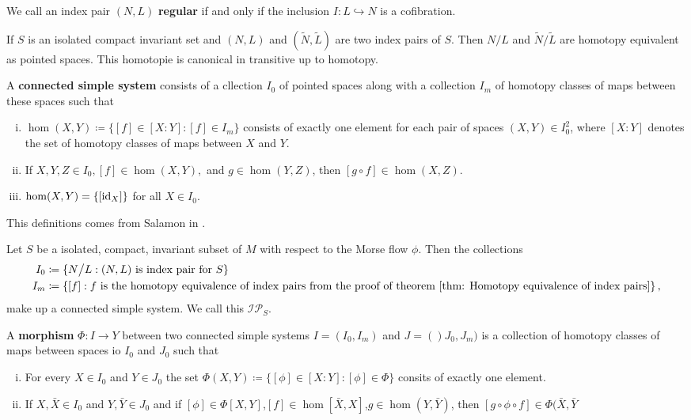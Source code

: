 \begin{definition}
	We call an index pair $(N,L)$ \textbf{regular} if and only if the inclusion $I: L \hookrightarrow N$ is a cofibration.
\end{definition}
\begin{theorem} \label{thm: Homotopy equivalence of index pairs}
	If $S$ is an isolated compact invariant set and $(N,L)$ and $(\tilde{N},\tilde{L})$ are two index pairs of $S$. Then $N/L$ and $\tilde{N}/\tilde{L}$ are homotopy equivalent as pointed spaces. This homotopie is canonical in transitive up to homotopy. 
\end{theorem}
\begin{definition}
	A \textbf{connected simple system} consists of a cllection $I_0$ of pointed spaces along with a collection $I_m$ of homotopy classes of maps between these spaces such that 
		\begin{enumerate}[(i)]
			\item $\hom(X,Y)\coloneq \{[f]\in [X:Y]:[f]\in I_m\}$ consists of exactly one element for each pair of spaces $(X,Y)\in I_0^2$, where $[X:Y]$ denotes the set of homotopy classes of maps between $X$ and $Y$.
			\item If $X,Y,Z\in I_0,[f]\in \hom(X,Y),$ and $g\in \hom(Y,Z)$, then $[g\circ f]\in \hom(X,Z)$.
			\item $\hom(X,Y)=\{[\operatorname{\mathrm{id}}_X]\}$ for all $X\in I_0$. 
		\end{enumerate}
\end{definition}
\begin{remark}
	This definitions comes from Salamon in \cite{Salamon1985}.
\end{remark}
\begin{remark} Let $S$ be a isolated, compact, invariant subset of $M$ with respect to the Morse flow $\phi$. Then the collections
\begin{align*}
	I_0&\coloneq \{N\big/ L: (N,L)\text{ is index pair for }S\}\\
	I_m&\coloneq \{[f]: f \text{ is the homotopy equivalence of index pairs from the proof of theorem \ref{thm: Homotopy equivalence of index pairs}}\}\,,
\end{align*} make up a connected simple system. We call this $\mathcal{IP}_S$.
\end{remark}
\begin{definition}
A \textbf{morphism} $\Phi:I\to Y$ between two connected simple systems $I=(I_0,I_m)$ and $J=()J_0,J_m)$ is a collection of homotopy classes of maps between spaces io $I_0$ and $J_0$ such that
\begin{enumerate}[(i)]
	\item For every $X\in I_0$ and $Y\in J_0$ the set $\Phi(X,Y)\coloneq \{[\phi]\in [X:Y]:[\phi]\in \Phi\}$ consits of exactly one element. 
	\item If $X,\bar{X}\in I_0$ and $Y,\bar{Y}\in J_0$ and if $[\phi]\in \Phi[X,Y]$,$[f]\in \hom[\bar{X},X]$,$g\in \hom(Y,\bar{Y})$, then $[g\circ \phi\circ f]\in \Phi(\bar{X},\bar{Y}$
\end{enumerate}
\end{definition}
